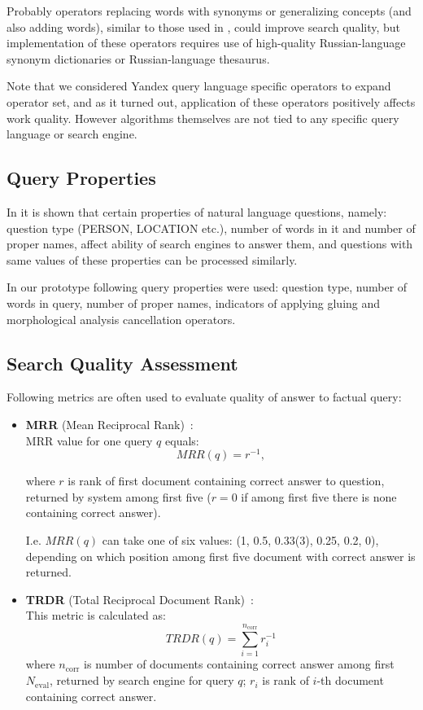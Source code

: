 \documentclass{article}
\begin{document}
Probably operators replacing words with synonyms or generalizing concepts (and
also adding words), similar to those used in \cite{qa:radev:qasm}, could
improve search quality, but implementation of these operators requires
use of high-quality Russian-language synonym dictionaries or Russian-language thesaurus.

Note that we considered Yandex query language specific
operators to expand operator set, and as it turned out,
application of these operators positively affects work quality.
However algorithms themselves are not tied to any
specific query language or search engine.

\subsection{Query Properties}
In \cite{qa:radev:getting_answers} it is shown that certain
properties of natural language questions, namely: question type (PERSON, LOCATION etc.),
number of words in it and number of proper names,
affect ability of search engines to answer them, and questions with same values of
these properties can be processed similarly.

In our prototype following query properties were used:
question type,
number of words in query,
number of proper names,
indicators of applying gluing and morphological analysis cancellation operators.

\subsection{Search Quality Assessment} \label{trdr}

Following metrics are often used to evaluate quality of answer to factual query:

\begin{itemize}
\item {\bf MRR} (Mean Reciprocal Rank)~\cite{qa:TREC8:evaluation}: \\
MRR value for one query $q$ equals:
$$MRR(q) = r^{-1},$$

where $r$ is rank of first document containing correct answer to question,
returned by system among first five
($r=0$ if among first five there is none containing correct answer).

I.e. $MRR(q)$ can take one of six values:
(1, 0.5, 0.33(3), 0.25, 0.2, 0), depending on which position among first five
document with correct answer is returned.

\item {\bf TRDR} (Total Reciprocal Document Rank)~\cite{qa:radev:qasm}: \\
This metric is calculated as:
$$TRDR(q) = \sum_{i=1}^{n_{\text{corr}}} r_i^{-1}$$
where $n_{\text{corr}}$ is number of documents containing correct answer among first
$N_\text{eval}$,
returned by search engine for query $q$;
$r_i$ is rank of $i$-th document containing correct answer.

\end{itemize}
\end{document}
